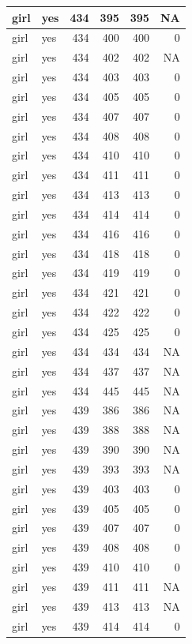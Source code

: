 \documentclass[man]{apa6}
\begin{document}
\begin{tabular}{l|l|r|r|r|r}
\hline
girl & yes & 434 & 395 & 395 & NA\\
\hline
girl & yes & 434 & 400 & 400 & 0\\
\hline
girl & yes & 434 & 402 & 402 & NA\\
\hline
girl & yes & 434 & 403 & 403 & 0\\
\hline
girl & yes & 434 & 405 & 405 & 0\\
\hline
girl & yes & 434 & 407 & 407 & 0\\
\hline
girl & yes & 434 & 408 & 408 & 0\\
\hline
girl & yes & 434 & 410 & 410 & 0\\
\hline
girl & yes & 434 & 411 & 411 & 0\\
\hline
girl & yes & 434 & 413 & 413 & 0\\
\hline
girl & yes & 434 & 414 & 414 & 0\\
\hline
girl & yes & 434 & 416 & 416 & 0\\
\hline
girl & yes & 434 & 418 & 418 & 0\\
\hline
girl & yes & 434 & 419 & 419 & 0\\
\hline
girl & yes & 434 & 421 & 421 & 0\\
\hline
girl & yes & 434 & 422 & 422 & 0\\
\hline
girl & yes & 434 & 425 & 425 & 0\\
\hline
girl & yes & 434 & 434 & 434 & NA\\
\hline
girl & yes & 434 & 437 & 437 & NA\\
\hline
girl & yes & 434 & 445 & 445 & NA\\
\hline
girl & yes & 439 & 386 & 386 & NA\\
\hline
girl & yes & 439 & 388 & 388 & NA\\
\hline
girl & yes & 439 & 390 & 390 & NA\\
\hline
girl & yes & 439 & 393 & 393 & NA\\
\hline
girl & yes & 439 & 403 & 403 & 0\\
\hline
girl & yes & 439 & 405 & 405 & 0\\
\hline
girl & yes & 439 & 407 & 407 & 0\\
\hline
girl & yes & 439 & 408 & 408 & 0\\
\hline
girl & yes & 439 & 410 & 410 & 0\\
\hline
girl & yes & 439 & 411 & 411 & NA\\
\hline
girl & yes & 439 & 413 & 413 & NA\\
\hline
girl & yes & 439 & 414 & 414 & 0\\

\end{tabular}
\end{document}
